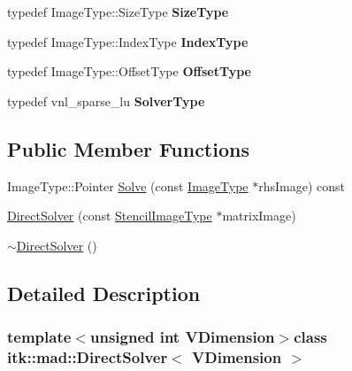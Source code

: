 \begin{DoxyCompactItemize}
\item 
\hypertarget{classitk_1_1mad_1_1_direct_solver_a21fed6981e4a82d907a7413c58648884}{typedef Image\-Type\-::\-Size\-Type {\bfseries Size\-Type}}\label{classitk_1_1mad_1_1_direct_solver_a21fed6981e4a82d907a7413c58648884}

\item 
\hypertarget{classitk_1_1mad_1_1_direct_solver_a17f02f4595b0fd5f6cf293c6cc69f8c1}{typedef Image\-Type\-::\-Index\-Type {\bfseries Index\-Type}}\label{classitk_1_1mad_1_1_direct_solver_a17f02f4595b0fd5f6cf293c6cc69f8c1}

\item 
\hypertarget{classitk_1_1mad_1_1_direct_solver_a76fbf4ab15dd72352d1d2837c6a8a9aa}{typedef Image\-Type\-::\-Offset\-Type {\bfseries Offset\-Type}}\label{classitk_1_1mad_1_1_direct_solver_a76fbf4ab15dd72352d1d2837c6a8a9aa}

\item 
\hypertarget{classitk_1_1mad_1_1_direct_solver_a8c38d1fb0578ff7681daba69a2a0f0f1}{typedef vnl\-\_\-sparse\-\_\-lu {\bfseries Solver\-Type}}\label{classitk_1_1mad_1_1_direct_solver_a8c38d1fb0578ff7681daba69a2a0f0f1}

\end{DoxyCompactItemize}
\subsection*{Public Member Functions}
\begin{DoxyCompactItemize}
\item 
Image\-Type\-::\-Pointer \hyperlink{classitk_1_1mad_1_1_direct_solver_a2bc09207502e7a20e41aa2a5a46c30a2}{Solve} (const \hyperlink{class_image}{Image\-Type} $\ast$rhs\-Image) const 
\item 
\hyperlink{classitk_1_1mad_1_1_direct_solver_a3231acea6a141f7dc17c0baff95c2907}{Direct\-Solver} (const \hyperlink{classitk_1_1mad_1_1_stencil_image}{Stencil\-Image\-Type} $\ast$matrix\-Image)
\item 
\hyperlink{classitk_1_1mad_1_1_direct_solver_a119e00614a1091b40786888be7bb6c59}{$\sim$\-Direct\-Solver} ()
\end{DoxyCompactItemize}


\subsection{Detailed Description}
\subsubsection*{template$<$unsigned int V\-Dimension$>$class itk\-::mad\-::\-Direct\-Solver$<$ V\-Dimension $>$}

